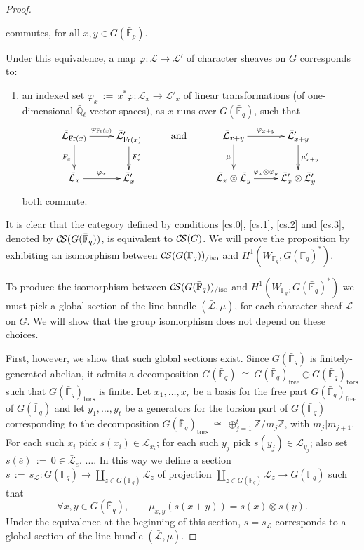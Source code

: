 \documentclass[11pt]{amsart}
\makeatletter
\theoremstyle{plain}
\theoremstyle{definition}
\theoremstyle{remark}
\newcommand{\ZZ}{{\mathbb{Z}}}
\newcommand{\EE}{\mathbb{\bar Q}_\ell}
\newcommand{\bFq}{{\mathbb{\bar F}_q}}
\newcommand{\Fq}{{\mathbb{F}_q}}
\newcommand{\bFp}{{\mathbb{\bar F}_p}}
\newcommand{\Frob}{{\operatorname{Fr}}}
\newcommand{\cdef}[1]{{{\color{cyan}#1}\index{#1}}}
\newcommand{\ceq}{{\, :=\, }}
\newcommand{\iso}{{\ \cong\ }}
\newcommand{\cs}[1]{{\mathcal{#1}}}
\newcommand{\gcs}[1]{{\mathcal{\bar #1}}}
\newcommand{\CS}{{\mathcal{C\hskip-1.8pt S}}}
\newcommand{\labitem}[2]{%
\def\@itemlabel{\textbf{#1}}
\item
\def\@currentlabel{#1}\label{#2}}
\newcommand\Clifton[1]{\marginpar{\smaller\smaller CC: #1}}
\makeatother
\begin{document}
\begin{proof}
\begin{enumerate}
\[{}
\]
commutes, for all $x,y\in G(\bFp)$.
\end{enumerate}
Under this equivalence, a map $\varphi : \cs{L} \to \cs{L'}$ of character sheaves on $G$ corresponds to:
\begin{enumerate}
\labitem{(cs.3)}{cs.3} an indexed set $\varphi_x \ceq x^*\varphi: \gcs{L}_x \to \gcs{L'}_x$ of linear transformations (of one-dimensional $\EE$-vector spaces), as $x$ runs over $G(\bFq)$, such that
\[
\xymatrix{
\ar[d]_{F_x} \gcs{L}_{\Frob(x)} \ar[r]^{\varphi_{\Frob(x)}} & \ar[d]^{F_x'} \gcs{L'}_{\Frob(x)} &\text{and}& \ar[d]_{\mu} \gcs{L}_{x+y} \ar[r]^{\varphi_{x+y}} & \ar[d]^{\mu'_{x+y}} \gcs{L'}_{x+y} \\
\gcs{L}_x \ar[r]^{\varphi_x} & \gcs{L'}_x && \gcs{L}_x\otimes\gcs{L}_y \ar[r]^{\varphi_x\otimes \varphi_y} & \gcs{L'}_x \otimes \gcs{L'}_y\\
}
\]
both commute.
\end{enumerate}
It is clear that the category defined by conditions \ref{cs.0}, \ref{cs.1}, \ref{cs.2} and \ref{cs.3}, denoted by \cdef{$\CS(G(\bFq))$}, is equivalent to $\CS(G)$. We will prove the proposition by exhibiting an isomorphism between $\CS(G(\bFq))_{/\text{iso}}$ and $H^1(W_{\Fq}, G(\bFq)^*)$.

To produce the isomorphism between $\CS(G(\bFq))_{/\text{iso}}$ and $H^1(W_{\Fq}, G(\bFq)^*)$ we must pick a global section of the line bundle $(\gcs{L},\mu)$, for each character sheaf $\cs{L}$ on $G$. We will show that the group isomorphism does not depend on these choices. 

First, however, we show that such global sections exist.
Since $G(\bFq)$ is finitely-generated abelian, it admits a decomposition $G(\bFq) \iso G(\bFq)_\text{free} \oplus G(\bFq)_\text{tors}$ such that $G(\bFq)_\text{tors}$ is finite.
Let $x_1, \ldots , x_r$ be a basis for the free part $G(\bFq)_\text{free}$ of $G(\bFq)$ and let $y_1, \ldots , y_t$ be a generators for the torsion part of $G(\bFq)$ corresponding to the decomposition $G(\bFq)_\text{tors} \iso \oplus_{j=1}^t \ZZ/m_j\ZZ$, with $m_j \vert m_{j+1}$. For each such $x_i$ pick $s(x_i)\in \gcs{L}_{x_i}$; for each such $y_j$ pick $s(y_j) \in \gcs{L}_{y_j}$; also set $s({\bar e}) \ceq 0 \in \gcs{L}_{\bar e}$. .... \Clifton{I'll finish this later.} In this way we define a section $s \ceq s_\cs{L} : G(\bFq) \to \coprod_{z\in G(\bFq)} \gcs{L}_z$ of projection $\coprod_{z\in G(\bFq)} \gcs{L}_z \to G(\bFq)$ such that 
\begin{equation}\label{section}
\forall x,y \in G(\bFq), \qquad \mu_{x,y}(s(x+y)) = s(x)\otimes s(y).
\end{equation}
Under the equivalence at the beginning of this section, $s = s_\cs{L}$ corresponds to a global section of the line bundle $(\gcs{L},\mu)$.


\end{proof}
\end{document}
